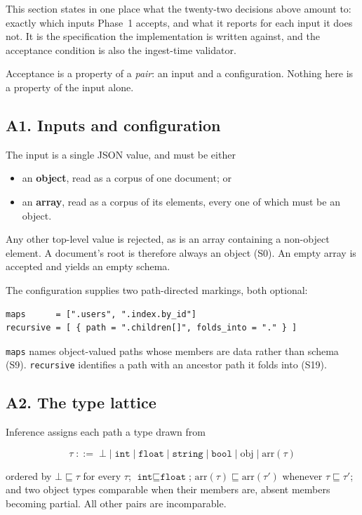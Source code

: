 This section states in one place what the twenty-two decisions above amount
to: exactly which inputs Phase~1 accepts, and what it reports for each input
it does not. It is the specification the implementation is written against,
and the acceptance condition is also the ingest-time validator.

Acceptance is a property of a \emph{pair}: an input and a configuration.
Nothing here is a property of the input alone.

\subsection*{A1. Inputs and configuration}

The input is a single JSON value, and must be either

\begin{itemize}
  \item an \textbf{object}, read as a corpus of one document; or
  \item an \textbf{array}, read as a corpus of its elements, every one of
        which must be an object.
\end{itemize}

\noindent
Any other top-level value is rejected, as is an array containing a non-object
element. A document's root is therefore always an object (S0). An empty array
is accepted and yields an empty schema.

The configuration supplies two path-directed markings, both optional:

\begin{lstlisting}[style=json]
maps      = [".users", ".index.by_id"]
recursive = [ { path = ".children[]", folds_into = "." } ]
\end{lstlisting}

\noindent
\texttt{maps} names object-valued paths whose members are data rather than
schema (S9). \texttt{recursive} identifies a path with an ancestor path it
folds into (S19).

\subsection*{A2. The type lattice}

Inference assigns each path a type drawn from

\[
  \tau \;::=\; \bot \mid \texttt{int} \mid \texttt{float} \mid \texttt{string}
       \mid \texttt{bool} \mid \mathrm{obj} \mid \mathrm{arr}(\tau)
\]

\noindent
ordered by $\bot \sqsubseteq \tau$ for every $\tau$; $\texttt{int}
\sqsubseteq \texttt{float}$; $\mathrm{arr}(\tau) \sqsubseteq
\mathrm{arr}(\tau')$ whenever $\tau \sqsubseteq \tau'$; and two object types
comparable when their members are, absent members becoming partial. All other
pairs are incomparable.

